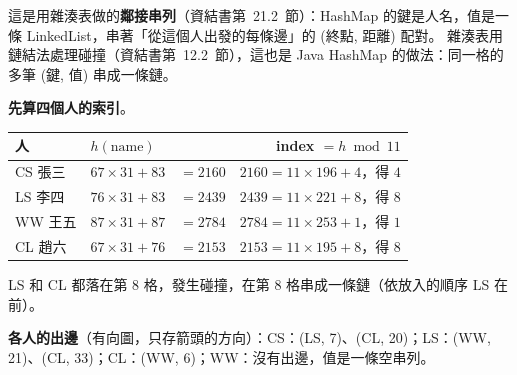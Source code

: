 \begin{pastsoln}
這是用雜湊表做的\textbf{鄰接串列}（資結書第~21.2~節）：HashMap 的鍵是人名，值是一條 LinkedList，串著「從這個人出發的每條邊」的
(終點, 距離) 配對。 雜湊表用鏈結法處理碰撞（資結書第~12.2~節），這也是 Java HashMap 的做法：同一格的多筆 (鍵, 值) 串成一條鏈。

\textbf{先算四個人的索引}。
\begin{center}
\begin{tabular}{llrr}
\toprule
人 & $h(\text{name})$ & & index $= h \bmod 11$ \\
\midrule
CS 張三 & $67 \times 31 + 83$ & $= 2160$ & $2160 = 11 \times 196 + 4$，得 $4$ \\
LS 李四 & $76 \times 31 + 83$ & $= 2439$ & $2439 = 11 \times 221 + 8$，得 $8$ \\
WW 王五 & $87 \times 31 + 87$ & $= 2784$ & $2784 = 11 \times 253 + 1$，得 $1$ \\
CL 趙六 & $67 \times 31 + 76$ & $= 2153$ & $2153 = 11 \times 195 + 8$，得 $8$ \\
\bottomrule
\end{tabular}
\end{center}
LS 和 CL 都落在第 $8$ 格，發生碰撞，在第 $8$ 格串成一條鏈（依放入的順序 LS 在前）。

\textbf{各人的出邊}（有向圖，只存箭頭的方向）：CS：(LS, 7)、(CL, 20)；LS：(WW, 21)、(CL, 33)；CL：(WW, 6)；WW：沒有出邊，值是一條空串列。


\end{pastsoln}
